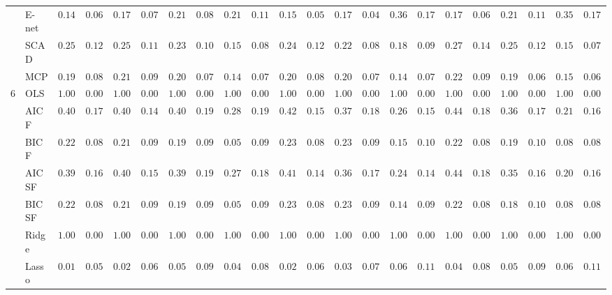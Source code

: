 \begin{tabular}{ll|ll|llllll|llllll|llllll}
 & E-net  & $0.1450$ & $0.0655$ & $0.1750$ & $0.0725$ & $0.2100$ & $0.0874$ & $0.2183$ & $0.1103$ & $0.1567$ & $0.0520$ & $0.1783$ & $0.0427$ & $0.3667$ & $0.1725$ & $0.1700$ & $0.0669$ & $0.2150$ & $0.1191$ & $0.3533$ & $0.1745$ \\
 & SCAD  & $0.2517$ & $0.1265$ & $0.2533$ & $0.1172$ & $0.2333$ & $0.1005$ & $0.1533$ & $0.0810$ & $0.2400$ & $0.1215$ & $0.2250$ & $0.0898$ & $0.1850$ & $0.0974$ & $0.2767$ & $0.1445$ & $0.2567$ & $0.1218$ & $0.1583$ & $0.0763$ \\
 & MCP  & $0.1983$ & $0.0810$ & $0.2150$ & $0.0926$ & $0.2017$ & $0.0760$ & $0.1417$ & $0.0799$ & $0.2033$ & $0.0806$ & $0.2033$ & $0.0733$ & $0.1450$ & $0.0773$ & $0.2200$ & $0.0944$ & $0.1983$ & $0.0699$ & $0.1583$ & $0.0643$ \\\hline
6 & OLS  & $1.0000$ & $0.0000$ & $1.0000$ & $0.0000$ & $1.0000$ & $0.0000$ & $1.0000$ & $0.0000$ & $1.0000$ & $0.0000$ & $1.0000$ & $0.0000$ & $1.0000$ & $0.0000$ & $1.0000$ & $0.0000$ & $1.0000$ & $0.0000$ & $1.0000$ & $0.0000$ \\
 & AIC F  & $0.4000$ & $0.1708$ & $0.4000$ & $0.1498$ & $0.4033$ & $0.1999$ & $0.2850$ & $0.1958$ & $0.4217$ & $0.1525$ & $0.3717$ & $0.1833$ & $0.2633$ & $0.1502$ & $0.4450$ & $0.1820$ & $0.3633$ & $0.1714$ & $0.2133$ & $0.1693$ \\
 & BIC F  & $0.2200$ & $0.0883$ & $0.2183$ & $0.0938$ & $0.1917$ & $0.0959$ & $0.0500$ & $0.0902$ & $0.2300$ & $0.0879$ & $0.2367$ & $0.0953$ & $0.1500$ & $0.1019$ & $0.2233$ & $0.0893$ & $0.1900$ & $0.1060$ & $0.0850$ & $0.0870$ \\
 & AIC SF  & $0.3917$ & $0.1630$ & $0.4017$ & $0.1519$ & $0.3967$ & $0.1936$ & $0.2767$ & $0.1838$ & $0.4117$ & $0.1430$ & $0.3667$ & $0.1788$ & $0.2483$ & $0.1470$ & $0.4417$ & $0.1810$ & $0.3533$ & $0.1646$ & $0.2033$ & $0.1651$ \\
 & BIC SF  & $0.2200$ & $0.0883$ & $0.2183$ & $0.0938$ & $0.1900$ & $0.0977$ & $0.0500$ & $0.0902$ & $0.2300$ & $0.0879$ & $0.2367$ & $0.0953$ & $0.1483$ & $0.0974$ & $0.2233$ & $0.0893$ & $0.1883$ & $0.1077$ & $0.0850$ & $0.0870$ \\
 & Ridge  & $1.0000$ & $0.0000$ & $1.0000$ & $0.0000$ & $1.0000$ & $0.0000$ & $1.0000$ & $0.0000$ & $1.0000$ & $0.0000$ & $1.0000$ & $0.0000$ & $1.0000$ & $0.0000$ & $1.0000$ & $0.0000$ & $1.0000$ & $0.0000$ & $1.0000$ & $0.0000$ \\
 & Lasso  & $0.0183$ & $0.0575$ & $0.0250$ & $0.0686$ & $0.0550$ & $0.0978$ & $0.0417$ & $0.0866$ & $0.0200$ & $0.0639$ & $0.0333$ & $0.0749$ & $0.0683$ & $0.1114$ & $0.0400$ & $0.0825$ & $0.0533$ & $0.0914$ & $0.0650$ & $0.1133$ \\

\end{tabular}
